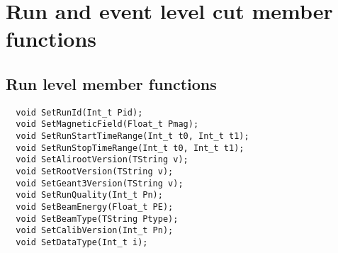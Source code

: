 \section{Run and event level cut member functions}
\label{App:ObjectCuts}
\subsection{Run level member functions}
{\ttfamily \noindent
\begin{verbatim}
  void SetRunId(Int_t Pid);
  void SetMagneticField(Float_t Pmag);
  void SetRunStartTimeRange(Int_t t0, Int_t t1);
  void SetRunStopTimeRange(Int_t t0, Int_t t1);
  void SetAlirootVersion(TString v);
  void SetRootVersion(TString v);
  void SetGeant3Version(TString v);
  void SetRunQuality(Int_t Pn);
  void SetBeamEnergy(Float_t PE);
  void SetBeamType(TString Ptype);
  void SetCalibVersion(Int_t Pn);
  void SetDataType(Int_t i);
\end{verbatim}
}
